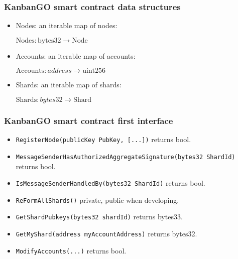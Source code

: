 \begin{frame}
\frametitle{KanbanGO smart contract data structures}
\begin{itemize}
\item Nodes: an iterable map of nodes: 

\hfil\hfil
$\text{Nodes}:\text{bytes32}\to \text{Node}$
\item Accounts: an iterable map of accounts:

\hfil\hfil$\text{Accounts}: address \to \text{uint256}$
\item Shards: an iterable map of shards:

\hfil\hfil$\text{Shards}: bytes32 \to \text{Shard}$
\end{itemize}
\end{frame}

\begin{frame}[fragile]
\frametitle{KanbanGO smart contract first interface}

\begin{itemize}
\item \verb|RegisterNode(publicKey PubKey, [...])| returns bool.
\item \verb|MessageSenderHasAuthorizedAggregateSignature(bytes32 ShardId)| returns bool.
\item \verb|IsMessageSenderHandledBy(bytes32 ShardId)| returns bool.
\item \verb|ReFormAllShards()| private, public when developing.
\item \verb|GetShardPubkeys(bytes32 shardId)| returns bytes33.
\item \verb|GetMyShard(address myAccountAddress)| returns bytes32.
\item \verb|ModifyAccounts(...)| returns bool.
\end{itemize}
\end{frame}


